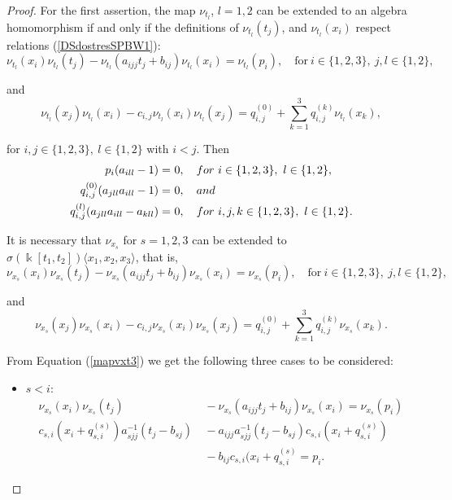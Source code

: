 \documentclass[10pt,a4paper]{amsart}
\begin{document}
\begin{proof}
For the first assertion, the map $\nu_{t_l}$, $l=1, 2$ can be extended to an algebra homomorphism if and only if the definitions of $\nu_{t_l}(t_j)$,  and $\nu_{t_l}(x_i)$ respect relations  {\rm (}\ref{DSdostresSPBW1}{\rm )}: 
\begin{equation*}
\nu_{t_l}(x_i)\nu_{t_l}(t_j)-\nu_{t_l}(a_{ijj}t_j+b_{ij})\nu_{t_l}(x_i) = \nu_{t_l}(p_i), \quad \text{for}\ i\in\{1, 2, 3\},\ j, l \in \{1, 2\},
\end{equation*}

and
\begin{equation*}
\nu_{t_l}(x_j)\nu_{t_l}(x_i)-c_{i,j}\nu_{t_l}(x_i)\nu_{t_l}(x_j) = q_{i,j}^{(0)}+\sum_{k=1}^{3}q_{i,j}^{(k)}\nu_{t_l}(x_k), 
\end{equation*}

for $i, j \in \{1, 2, 3\}, \ l \in \{1, 2\}$ with $i < j$. Then
\begin{align}
p_i(a_{ill}-1) = &\ 0, \quad {\rm for}\ i \in\{1, 2, 3\}, \ l \in \{1, 2\}, \notag \\
q_{i,j}^{(0)}(a_{jll}a_{ill}-1) = &\ 0, \quad {\rm and} \label{firstsecondrel33} \\
q_{i,j}^{(l)}(a_{jll}a_{ill}-a_{kll}) = &\ 0, \quad {\rm for} \ i, j,k \in \{1, 2, 3\}, \ l \in \{1, 2\}. \notag 
\end{align}

It is necessary that $\nu_{x_s}$ for $s = 1, 2, 3$ can be extended to $\sigma(\Bbbk[t_1, t_2])\langle x_1, x_2, x_3\rangle$, that is, 
\begin{equation}\label{mapvxt3}
\nu_{x_s}(x_i)\nu_{x_s}(t_j)-\nu_{x_s}(a_{ijj}t_j+b_{ij})\nu_{x_s}(x_i) = \nu_{x_s}(p_i), \quad \text{for}\ i\in\{1, 2, 3\},\ j, l \in \{1, 2\},
\end{equation}

and
\begin{equation}\label{mapvxx33}
\nu_{x_s}(x_j)\nu_{x_s}(x_i)-c_{i,j}\nu_{x_s}(x_i)\nu_{x_s}(x_j) = q_{i,j}^{(0)}+\sum_{k=1}^{3}q_{i,j}^{(k)}\nu_{x_s}(x_k).
\end{equation}

From Equation {\rm (}\ref{mapvxt3}{\rm )} we get the following three cases to be considered:
\begin{itemize}
    \item $s < i$:
    \begin{align*}
     \nu_{x_s}(x_i)\nu_{x_s}(t_j) &\ - \nu_{x_s}(a_{ijj}t_j+b_{ij})\nu_{x_s}(x_i) = \nu_{x_s}(p_i)\\
     c_{s,i}(x_i+q_{s,i}^{(s)})a_{sjj}^{-1}(t_j-b_{sj}) &\ - a_{ijj}a_{sjj}^{-1}(t_j-b_{sj})c_{s,i}(x_i+q_{s,i}^{(s)}) \\
        &\ - b_{ij}c_{s,i}(x_i+q_{s,i}^{(s)}= p_i.
    \end{align*}
    

\end{itemize}
\end{proof}
\end{document}
